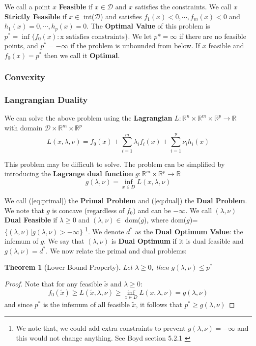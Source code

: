 \documentclass[]{article}
\theoremstyle{mattstyle}
\newtheorem{theorem}{Theorem}[section]
\theoremstyle{definition}
\begin{document}
We call a point $x$ \textbf{Feasible} if $x\in \mathcal{D}$ and $x$ satisfies the constraints. We call $x$ \textbf{Strictly Feasible} if $x\in$ int($\mathcal{D}$) and satisfies $f_1(x)<0, \cdots, f_m(x)<0$ and $h_1(x)=0, \cdots, h_p(x)=0$. The \textbf{Optimal Value} of this problem is $p^*=\inf\{f_0(x): \text{x satisfies constraints}\}$. We let $p* = \infty$ if there are no feasible points, and $p^*=-\infty$ if the problem is unbounded from below. If $x$ feasible and $f_0(x) = p^*$ then we call it \textbf{Optimal}.

\subsubsection{Convexity}


\subsubsection{Langrangian Duality}
We can solve the above problem using the \textbf{Lagrangian} $L: \mathbb{R}^n\times \mathbb{R}^m\times \mathbb{R}^p \rightarrow \mathbb{R} $ with domain $\mathcal{D}\times\mathbb{R}^m\times \mathbb{R}^p$
\begin{equation}\label{eq:primal}
L(x,\lambda,\nu) = f_0(x) + \sum_{i=1}^m \lambda_if_i(x) + \sum_{i=1}^p \nu_i h_i(x)
\end{equation}

This problem may be difficult to solve. The problem can be simplified by introducing the \textbf{Lagrange dual function} $g: \mathbb{R}^m\times \mathbb{R}^p \rightarrow \mathbb{R}$
\begin{equation}\label{eq:dual}
g(\lambda,\nu) =\inf\limits_{x\in D} L(x,\lambda,\nu)
\end{equation}

We call (\ref{eq:primal}) the \textbf{Primal Problem} and (\ref{eq:dual}) the \textbf{Dual Problem}. We note that $g$ is concave (regardless of $f_0$) and can be $-\infty$. We call $(\lambda, \nu)$ \textbf{Dual Feasible} if $\lambda \ge 0$ and $(\lambda, \nu) \in$ dom($g$), where dom($g$)=$\{ (\lambda, \nu) | g(\lambda, \nu)>-\infty\}$ \footnote{We note that, we could add extra constraints to prevent $g(\lambda, \nu)=-\infty$ and this would not change anything. See Boyd section 5.2.1 \cite{Boyd:2004:CO:993483}}. We denote $d^*$ as the \textbf{Dual Optimum Value}: the infemum of $g$. We say that $(\lambda,\nu)$ is \textbf{Dual Optimum} if it is dual feasible and $g(\lambda,\nu)=d^*$. We now relate the primal and dual problems:
\begin{theorem}[Lower Bound Property]
	Let $\lambda \ge 0$, then $g(\lambda, \nu) \le p^*$ 
\end{theorem}
\begin{proof}
	Note that for any feasible $\tilde{x}$ and $\lambda \ge 0$:
	$$f_0(\tilde{x}) \ge L(\tilde{x}, \lambda, \nu) \ge \inf\limits_{x\in D} L(x,\lambda,\nu) = g(\lambda, \nu)$$
	and since $p^*$ is the infemum of all feasible $\tilde{x}$, it follows that $ p^* \ge g(\lambda, \nu)$
\end{proof}
\end{document}
